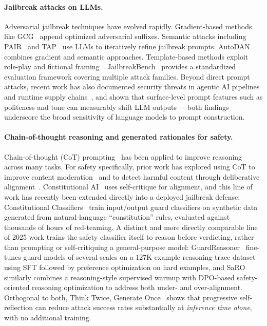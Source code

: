 \documentclass[superintelligence,article,submit,pdftex,moreauthors]{Definitions/mdpi}
\begin{document}
\paragraph{Jailbreak attacks on LLMs.}
Adversarial jailbreak techniques have evolved rapidly. Gradient-based methods like GCG~\citep{zou2023universal} append optimized adversarial suffixes. Semantic attacks including PAIR~\citep{chao2023jailbreaking} and TAP~\citep{mehrotra2024tree} use LLMs to iteratively refine jailbreak prompts. AutoDAN~\citep{liu2024autodan} combines gradient and semantic approaches. Template-based methods exploit role-play and fictional framing~\citep{wei2024jailbroken, shen2024anything}. JailbreakBench~\citep{chao2024jailbreakbench} provides a standardized evaluation framework covering multiple attack families. Beyond direct prompt attacks, recent work has also documented security threats in agentic AI pipelines and runtime supply chains~\citep{jiang2026agentic}, and shown that surface-level prompt features such as politeness and tone can measurably shift LLM outputs~\citep{cai2025tone}---both findings underscore the broad sensitivity of language models to prompt construction.

\paragraph{Chain-of-thought reasoning and generated rationales for safety.}
\label{sec:related-reasoning}
Chain-of-thought (CoT) prompting~\citep{wei2022chain} has been applied to improve reasoning across many tasks. For safety specifically, prior work has explored using CoT to improve content moderation~\citep{wang2024chain} and to detect harmful content through deliberative alignment~\citep{bai2024deliberative}. Constitutional AI~\citep{bai2022constitutional} uses self-critique for alignment, and this line of work has recently been extended directly into a deployed jailbreak defense: Constitutional Classifiers~\citep{sharma2025constitutional} train input/output guard classifiers on synthetic data generated from natural-language ``constitution'' rules, evaluated against thousands of hours of red-teaming. A distinct and more directly comparable line of 2025 work trains the safety classifier itself to reason before verdicting, rather than prompting or self-critiquing a general-purpose model: GuardReasoner~\citep{liu2025guardreasoner} fine-tunes guard models of several scales on a 127K-example reasoning-trace dataset using SFT followed by preference optimization on hard examples, and SaRO~\citep{mou2025saro} similarly combines a reasoning-style supervised warmup with DPO-based safety-oriented reasoning optimization to address both under- and over-alignment. Orthogonal to both, Think Twice, Generate Once~\citep{phan2025thinktwice} shows that progressive self-reflection can reduce attack success rates substantially at \emph{inference time alone}, with no additional training.
\end{document}
